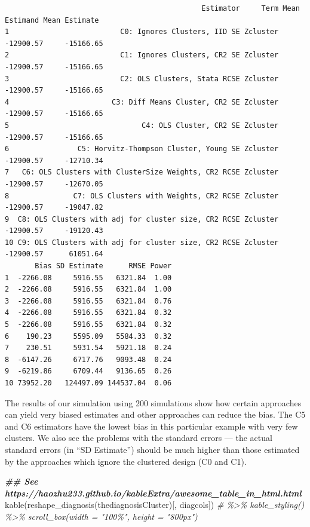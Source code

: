 \documentclass[
  12pt,
]{book}
\newenvironment{Shaded}{\begin{snugshade}}{\end{snugshade}}
\newcommand{\CommentTok}[1]{\textcolor[rgb]{0.56,0.35,0.01}{\textit{#1}}}
\newcommand{\DocumentationTok}[1]{\textcolor[rgb]{0.56,0.35,0.01}{\textbf{\textit{#1}}}}
\newcommand{\FunctionTok}[1]{\textcolor[rgb]{0.00,0.00,0.00}{#1}}
\newcommand{\NormalTok}[1]{#1}
\theoremstyle{definition}
\theoremstyle{definition}
\theoremstyle{definition}
\theoremstyle{remark}
\begin{document}
\begin{verbatim}
                                              Estimator     Term Mean Estimand Mean Estimate
1                          C0: Ignores Clusters, IID SE Zcluster     -12900.57     -15166.65
2                          C1: Ignores Clusters, CR2 SE Zcluster     -12900.57     -15166.65
3                          C2: OLS Clusters, Stata RCSE Zcluster     -12900.57     -15166.65
4                        C3: Diff Means Cluster, CR2 SE Zcluster     -12900.57     -15166.65
5                               C4: OLS Cluster, CR2 SE Zcluster     -12900.57     -15166.65
6                C5: Horvitz-Thompson Cluster, Young SE Zcluster     -12900.57     -12710.34
7   C6: OLS Clusters with ClusterSize Weights, CR2 RCSE Zcluster     -12900.57     -12670.05
8               C7: OLS Clusters with Weights, CR2 RCSE Zcluster     -12900.57     -19047.82
9  C8: OLS Clusters with adj for cluster size, CR2 RCSE Zcluster     -12900.57     -19120.43
10 C9: OLS Clusters with adj for cluster size, CR2 RCSE Zcluster     -12900.57      61051.64
       Bias SD Estimate      RMSE Power
1  -2266.08     5916.55   6321.84  1.00
2  -2266.08     5916.55   6321.84  1.00
3  -2266.08     5916.55   6321.84  0.76
4  -2266.08     5916.55   6321.84  0.32
5  -2266.08     5916.55   6321.84  0.32
6    190.23     5595.09   5584.33  0.32
7    230.51     5931.54   5921.18  0.24
8  -6147.26     6717.76   9093.48  0.24
9  -6219.86     6709.44   9136.65  0.26
10 73952.20   124497.09 144537.04  0.06
\end{verbatim}

The results of our simulation using 200 simulations show how certain
approaches can yield very biased estimates and other approaches can
reduce the bias. The C5 and C6 estimators have the lowest bias in this
particular example with very few clusters. We also see the problems with
the standard errors --- the actual standard errors (in ``SD Estimate'')
should be much higher than those estimated by the approaches which
ignore the clustered design (C0 and C1).

\begin{Shaded}
\begin{Highlighting}[]
\DocumentationTok{\#\# See https://haozhu233.github.io/kableExtra/awesome\_table\_in\_html.html}
\FunctionTok{kable}\NormalTok{(}\FunctionTok{reshape\_diagnosis}\NormalTok{(thediagnosisCluster)[, diagcols]) }\CommentTok{\# \%\textgreater{}\% kable\_styling() \%\textgreater{}\% scroll\_box(width = "100\%", height = "800px")}
\end{Highlighting}
\end{Shaded}
\end{document}
